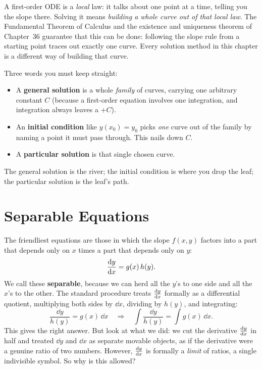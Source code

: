 \begin{happeningbox}
A first-order ODE is a \emph{local} law: it talks about one point at a time,
telling you the slope there. Solving it means \emph{building a whole curve out of
that local law}. The Fundamental Theorem of Calculus and the existence and
uniqueness theorem of Chapter~36 guarantee that this can be done: following the
slope rule from a starting point traces out exactly one curve. Every solution
method in this chapter is a different way of building that curve.
\end{happeningbox}

\begin{focusbox}
Three words you must keep straight:
\begin{itemize}
\item A \textbf{general solution} is a whole \emph{family} of curves, carrying one
arbitrary constant $C$ (because a first-order equation involves one integration,
and integration always leaves a $+C$).
\item An \textbf{initial condition} like $y(x_0)=y_0$ picks \emph{one} curve out of
the family by naming a point it must pass through. This nails down $C$.
\item A \textbf{particular solution} is that single chosen curve.
\end{itemize}
The general solution is the river; the initial condition is where you drop the
leaf; the particular solution is the leaf's path.
\end{focusbox}

\section{Separable Equations}
\label{ch37:sec-separable}

The friendliest equations are those in which the slope $f(x,y)$ factors into a part
that depends only on $x$ times a part that depends only on $y$:
\[
  \frac{\mathrm{d} y}{\mathrm{d} x} = g(x)\,h(y).
\]
We call these \textbf{separable}, because we can herd all the $y$'s to one side and
all the $x$'s to the other. The standard procedure treats $\frac{\mathrm{d} y}{\mathrm{d} x}$ formally
as a differential quotient, multiplying both sides by $\dd x$, dividing by
$h(y)$, and integrating:
\[
  \frac{\dd y}{h(y)} = g(x)\,\dd x
  \quad\Longrightarrow\quad
  \int \frac{\dd y}{h(y)} = \int g(x)\,\dd x.
\]
This gives the right answer. But look at what we did: we cut the derivative $\frac{\mathrm{d} y}{\mathrm{d} x}$ in
half and treated $\dd y$ and $\dd x$ as separate movable objects, as if the
derivative were a genuine ratio of two numbers. However, $\frac{\mathrm{d} y}{\mathrm{d} x}$ is formally a
\emph{limit} of ratios, a single indivisible symbol. So why is this allowed?

